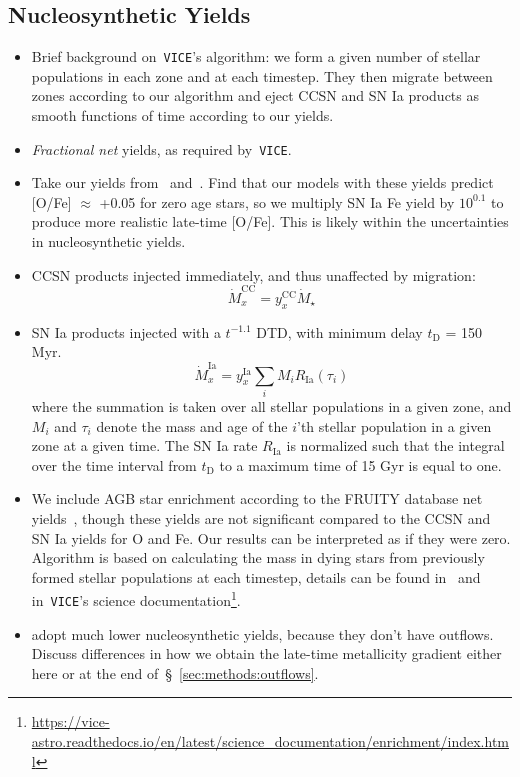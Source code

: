 \documentclass[a4paper, fleqn, usenatbib, useAMS]{mnras}
\begin{document}
\subsection{Nucleosynthetic Yields} 
\label{sec:methods:yields} 
\begin{itemize} 
	\item Brief background on~\texttt{VICE}'s algorithm: we form a given 
	number of stellar populations in each zone and at each timestep. They 
	then migrate between zones according to our algorithm and eject CCSN and 
	SN Ia products as smooth functions of time according to our yields. 

	\item \textit{Fractional net} yields, as required by~\texttt{VICE}. 

	\item Take our yields from~\citet{Weinberg2017} and~\citet{Johnson2020}. 
	Find that our models with these yields predict [O/Fe] $\approx$ +0.05 for 
	zero age stars, so we multiply SN Ia Fe yield by $10^{0.1}$ to produce 
	more realistic late-time [O/Fe]. This is likely within the uncertainties 
	in nucleosynthetic yields. 

	\item CCSN products injected immediately, and thus unaffected by 
	migration: 
	\begin{equation} 
	\dot{M}_x^\text{CC} = y_x^\text{CC}\dot{M}_\star 
	\end{equation} 

	\item SN Ia products injected with a $t^{-1.1}$ DTD, with minimum delay 
	$t_\text{D}$ = 150 Myr. 
	\begin{equation} 
	\dot{M}_x^\text{Ia} = y_x^\text{Ia} \sum_i M_i R_\text{Ia}(\tau_i) 
	\end{equation} 
	where the summation is taken over all stellar populations in a given zone, 
	and $M_i$ and $\tau_i$ denote the mass and age of the $i$'th stellar 
	population in a given zone at a given time. The SN Ia rate $R_\text{Ia}$ 
	is normalized such that the integral over the time interval from 
	$t_\text{D}$ to a maximum time of 15 Gyr is equal to one. 

	\item We include AGB star enrichment according to the FRUITY database net 
	yields~\citep{Cristallo2011}, though these yields are not significant 
	compared to the CCSN and SN Ia yields for O and Fe. Our results can be 
	interpreted as if they were zero. Algorithm is based on 
	calculating the mass in dying stars from previously formed stellar 
	populations at each timestep, details can be found in~\citet{Johnson2020} 
	and in~\texttt{VICE}'s science documentation\footnote{
		\url{https://vice-astro.readthedocs.io/en/latest/science_documentation/enrichment/index.html} 
	}. 

	\item \citet{Minchev2013} adopt much lower nucleosynthetic yields, 
	because they don't have outflows. Discuss differences in how we obtain the 
	late-time metallicity gradient either here or at the end 
	of~\S~\ref{sec:methods:outflows}. 
\end{itemize} 
\end{document}
